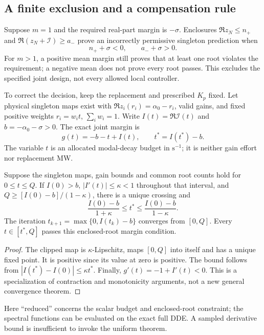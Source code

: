 \subsection{A finite exclusion and a compensation rule}
Suppose $m=1$ and the required real-part margin is $-\sigma$.
Enclosures $\Re z_N\le n_+$ and $\Re(z_N+\mathcal I)\ge a_-$ prove an
incorrectly permissive singleton prediction when
\begin{equation}
 n_++\sigma<0,\qquad a_-+\sigma>0.\label{eq:finite-decision}
\end{equation}
For $m>1$, a positive mean margin still proves that at least one root violates
the requirement; a negative mean does not prove every root passes.
This excludes the specified joint design, not every allowed local controller.

To correct the decision, keep the replacement and prescribed $K_p$ fixed.
Let physical singleton maps exist with
$\Re z_i(r_i)=\alpha_0-r_i$, valid gains, and fixed positive weights
$r_i=w_i t$, $\sum_iw_i=1$. Write $I(t)=\Re\mathcal I(t)$ and
$b=-\alpha_0-\sigma>0$. The exact joint margin is
\begin{equation}
 \boxed{g(t)=-b-t+I(t),\qquad t^*=I(t^*)-b.}\label{eq:budget-fixedpoint}
\end{equation}
The variable $t$ is an allocated modal-decay budget in $\mathrm{s}^{-1}$;
it is neither gain effort nor replacement MW.

\begin{theorem}
Suppose the singleton maps, gain bounds and common root counts hold for
$0\le t\le Q$. If $I(0)>b$, $|I'(t)|\le\kappa<1$ throughout that interval,
and $Q\ge[I(0)-b]/(1-\kappa)$, there is a unique crossing and
\begin{equation}
 \frac{I(0)-b}{1+\kappa}\le t^*\le
 \frac{I(0)-b}{1-\kappa}.
\end{equation}
The iteration $t_{k+1}=\max\{0,I(t_k)-b\}$ converges from $[0,Q]$.
Every $t\in[t^*,Q]$ passes this enclosed-root margin condition.
\end{theorem}
\begin{proof}
The clipped map is $\kappa$-Lipschitz, maps $[0,Q]$ into itself and has
a unique fixed point. It is positive since its value at zero is positive.
The bound follows from $|I(t^*)-I(0)|\le\kappa t^*$.
Finally, $g'(t)=-1+I'(t)<0$. This is a specialization of contraction and
monotonicity arguments, not a new general convergence theorem.
\end{proof}
Here ``reduced'' concerns the scalar budget and enclosed-root constraint;
the spectral functions can be evaluated on the exact full DDE. A sampled
derivative bound is insufficient to invoke the uniform theorem.

